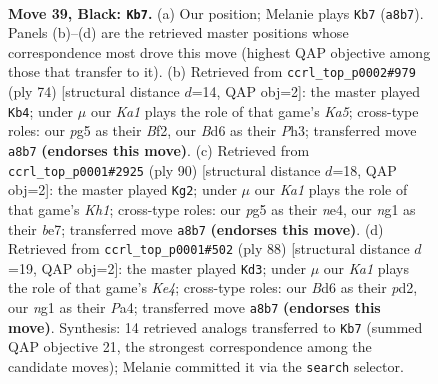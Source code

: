 \documentclass[11pt]{article}
\begin{document}
\clearpage

\begin{figure}[p]\centering
\begin{subfigure}{0.46\textwidth}\centering
\resizebox{\linewidth}{!}{%
\newchessgame
\chessboard[
  setfen={k7/8/1Bnb2p1/6P1/p1b5/8/8/4K1N1 b - - 13 39},
  showmover=false,
  pgfstyle=straightmove, color=movearrow, markmove={a8-b7}
]}
\caption{}
\end{subfigure}\hfill
\begin{subfigure}{0.46\textwidth}\centering
\resizebox{\linewidth}{!}{%
\newchessgame
\chessboard[
  setfen={8/2p5/6p1/K2k2P1/8/3b3P/5B2/8 w - - 1 38},
  showmover=false,
  pgfstyle=straightmove, color=movearrow, markmove={a5-b4}
]}
\caption{}
\end{subfigure}
\\[4pt]
\begin{subfigure}{0.46\textwidth}\centering
\resizebox{\linewidth}{!}{%
\newchessgame
\chessboard[
  setfen={5k2/2Nbb3/6p1/4B3/4n3/8/4BP2/7K w - - 2 46},
  showmover=false,
  pgfstyle=straightmove, color=movearrow, markmove={h1-g2}
]}
\caption{}
\end{subfigure}\hfill
\begin{subfigure}{0.46\textwidth}\centering
\resizebox{\linewidth}{!}{%
\newchessgame
\chessboard[
  setfen={8/2k1b3/7p/8/P3K3/7P/3p4/3B4 w - - 2 45},
  showmover=false,
  pgfstyle=straightmove, color=movearrow, markmove={e4-d3}
]}
\caption{}
\end{subfigure}
\caption{\textbf{Move 39, Black: \texttt{Kb7}.} (a) Our position; Melanie plays \texttt{Kb7} (\texttt{a8b7}). Panels (b)--(d) are the retrieved master positions whose correspondence most drove this move (highest QAP objective among those that transfer to it). (b) Retrieved from \texttt{ccrl\_top\_p0002\#979} (ply 74) [structural distance $d$=14, QAP obj=2]: the master played \texttt{Kb4}; under $\mu$ our \emph{Ka1} plays the role of that game's \emph{Ka5}; cross-type roles: our \emph{p}g5 as their \emph{B}f2, our \emph{B}d6 as their \emph{P}h3; transferred move \texttt{a8b7} \textbf{(endorses this move)}. (c) Retrieved from \texttt{ccrl\_top\_p0001\#2925} (ply 90) [structural distance $d$=18, QAP obj=2]: the master played \texttt{Kg2}; under $\mu$ our \emph{Ka1} plays the role of that game's \emph{Kh1}; cross-type roles: our \emph{p}g5 as their \emph{n}e4, our \emph{n}g1 as their \emph{b}e7; transferred move \texttt{a8b7} \textbf{(endorses this move)}. (d) Retrieved from \texttt{ccrl\_top\_p0001\#502} (ply 88) [structural distance $d$=19, QAP obj=2]: the master played \texttt{Kd3}; under $\mu$ our \emph{Ka1} plays the role of that game's \emph{Ke4}; cross-type roles: our \emph{B}d6 as their \emph{p}d2, our \emph{n}g1 as their \emph{P}a4; transferred move \texttt{a8b7} \textbf{(endorses this move)}. Synthesis: 14 retrieved analogs transferred to \texttt{Kb7} (summed QAP objective 21, the strongest correspondence among the candidate moves); Melanie committed it via the \texttt{search} selector.}
\label{fig:thought-m77}
\end{figure}
\end{document}
